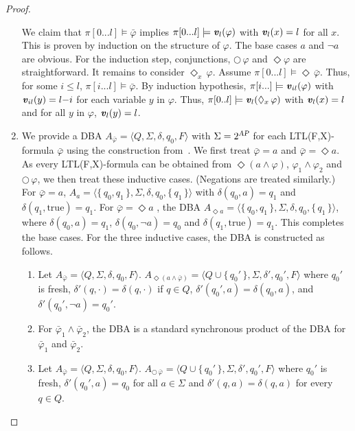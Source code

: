 \documentclass{llncs}
\newcommand{\smAP}{\mbox{\scriptsize \sl AP}}
\newcommand{\true}{\mbox{true}}
\newcommand{\set}[1]{\{ \, #1 \, \}}
\newcommand{\Next}{\bigcirc \, }
\newcommand{\X}{\Next}
\renewcommand{\leq}{\leqslant}
\renewcommand{\a}[1]{\textbf{\textit{#1}}}
\newcommand{\la}{\langle}
\newcommand{\ra}{\rangle}
\newcommand{\de}{\Diamond}
\begin{document}
\begin{proof}
\begin{enumerate}
We claim that $\pi[0...l] \models \bar\varphi$ implies $\pi[0...l] \models { {\a v}}_l(\varphi)$ with ${ {\a v}}_l(x) = l$ for all $x$. 
This is proven by induction on the structure of $\varphi$. 
The base cases $a$ and $\neg a$ are obvious.
For the induction step, conjunctions, $\X \varphi$ and $\de \varphi$ are straightforward.
It remains to consider $\de_x \, \varphi$.
Assume $\pi[0...l] \models \de \, \bar\varphi$. 
Thus, for some $i \leq l$, $\pi[i...l] \models \bar\varphi$. 
By induction hypothesis, $\pi[i...] \models{ {\a v}}_{il}(\varphi)$ with ${ {\a v}}_{il}(y)= l{-}i$ for each variable $y$ in $\varphi$. 
Thus, $\pi[0..l] \models {{ {\a v}}_l}(\de_x \, \varphi)$ with ${ {\a v}}_l(x)= l$ and for all $y$ in $\varphi$, ${ {\a v}}_l(y) = l$.
\item
We provide a DBA
$A_{\bar \varphi} = \la Q, \Sigma, \delta, q_0, F \ra$ with $\Sigma = 2^{\smAP}$ for each LTL(F,X)-formula $\bar \varphi$ using the construction from~\cite{DBLP:journals/tocl/AlurT04}.
We first treat $\bar \varphi = a$ and $\bar \varphi = \de a$.
As every LTL(F,X)-formula can be obtained from $\de (a \wedge \varphi)$, $\varphi_1 \wedge \varphi_2$ and $\X \varphi$, we then treat these inductive cases.
(Negations are treated similarly.)
For $\bar\varphi = a$, $A_{a} = \la \set{q_0,q_1}, \Sigma, \delta, q_0, \set{q_1} \ra$ with $\delta(q_0, a) = q_1$ and $\delta(q_1,\true) = q_1$.   For $\bar\varphi = \de a$ , the DBA $A_{\de a} = \la \set{q_0,q_1}, \Sigma, \delta, q_0, \set{q_1} \ra$, where $\delta(q_0,a) = q_1$, $\delta(q_0,\neg a) = q_0$ and $\delta(q_1,\true) = q_1$. This completes the base cases.
For the three inductive cases, the DBA is constructed as follows.
\begin{enumerate}
\item
Let $A_{\bar \varphi} = \la Q, \Sigma, \delta, q_0, F \ra$.
$A_{\de (a \wedge \bar \varphi)} = \la Q \cup \set{q_0'}, \Sigma,\delta', q_0', F\ra$ where $q_0'$ is fresh, 
$\delta'(q,{\cdot}) = \delta(q,{\cdot})$ if $q \in Q$, $\delta'(q_0',a) = \delta(q_0,a)$, and $\delta'(q_0', \neg a) = q_0'$. 
\item For $\bar \varphi_1 \wedge \bar \varphi_2$, the DBA is a standard synchronous product of the DBA for $\bar \varphi_1$ and $\bar \varphi_2$.
\item Let $A_{\bar \varphi} = \la Q, \Sigma, \delta, q_0, F \ra$.
$A_{\X\! \bar \varphi} = \la Q \cup \set{q_0'}, \Sigma, \delta', q_0', F \ra$ where $q_0'$ is fresh,  $\delta'(q_0',a) = q_0$ for all 
$a\in \Sigma$ and $\delta'(q,a) = \delta(q,a)$ for every $q \in Q$.
\end{enumerate}
  

\end{enumerate}
\end{proof}
\end{document}
